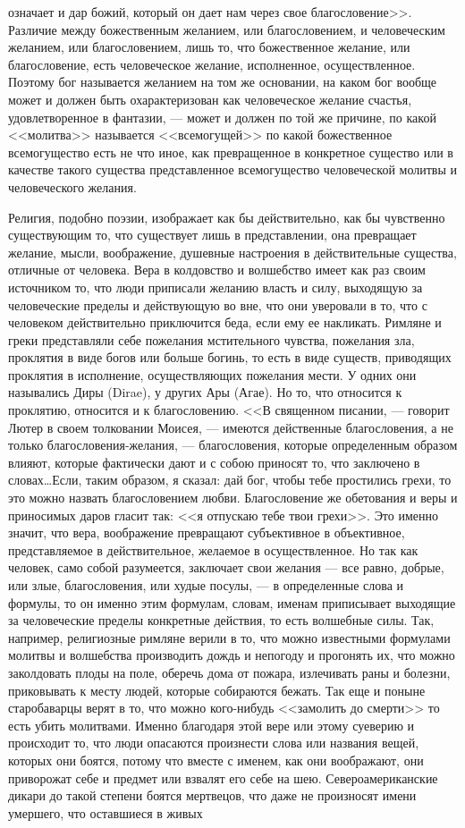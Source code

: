 \documentclass[12pt]{article}
\begin{document}
означает и дар божий, который он дает нам через свое благословение>>. Различие между божественным желанием, или благословением, и человеческим желанием, или благословением, лишь то, что божественное желание, или благословение, есть человеческое желание, исполненное, осуществленное. Поэтому бог называется желанием на том же основании, на каком бог вообще может и должен быть охарактеризован как человеческое желание счастья, удовлетворенное в фантазии, --- может и должен по той же причине, по какой <<молитва>> называется <<всемогущей>>  по какой божественное всемогущество есть не что иное, как превращенное в конкретное существо или в качестве такого существа представленное всемогущество человеческой молитвы и человеческого желания. 

Религия, подобно поэзии, изображает как бы действительно, как бы чувственно существующим то, что существует лишь в представлении, она превращает желание, мысли, воображение, душевные настроения в действительные существа, отличные от человека. Вера в колдовство и волшебство имеет как раз своим источником то, что люди приписали желанию власть и силу, выходящую за человеческие пределы и действующую во вне, что они уверовали в то, что с человеком действительно приключится беда, если ему ее накликать. Римляне и греки представляли себе пожелания мстительного чувства, пожелания зла, проклятия в виде богов или больше богинь, то есть в виде существ, приводящих проклятия в исполнение, осуществляющих пожелания мести. У одних они назывались Диры (Dirae), у других Ары (Агае). Но то, что относится к проклятию, относится и к благословению. <<В священном писании, --- говорит Лютер в своем толковании Моисея, --- имеются действенные благословения, а не только благословения-желания, --- благословения, которые определенным образом влияют, которые фактически дают и с собою приносят то, что заключено в словах\dots Если, таким образом, я сказал: дай бог, чтобы тебе простились грехи, то это можно назвать благословением любви. Благословение же обетования и веры и приносимых даров гласит так: <<я отпускаю тебе твои грехи>>. Это именно значит, что вера, воображение превращают субъективное в объективное, представляемое в действительное, желаемое в осуществленное. Но так как человек, само собой разумеется, заключает свои желания --- все равно, добрые, или злые, благословения, или худые посулы, --- в определенные слова и формулы, то он именно этим формулам, словам, именам приписывает выходящие за человеческие пределы конкретные действия, то есть волшебные силы. Так, например, религиозные римляне верили в то, что можно известными формулами молитвы и волшебства производить дождь и непогоду и прогонять их, что можно заколдовать плоды на поле, оберечь дома от пожара, излечивать раны и болезни, приковывать к месту людей, которые собираются бежать. Так еще и поныне старобаварцы верят в то, что можно кого-нибудь <<замолить до смерти>>  то есть убить молитвами. Именно благодаря этой вере или этому суеверию и происходит то, что люди опасаются произнести слова или названия вещей, которых они боятся, потому что вместе с именем, как они воображают, они приворожат себе и предмет или взвалят его себе на шею. Североамериканские дикари до такой степени боятся мертвецов, что даже не произносят имени умершего, что оставшиеся в живых 
\end{document}

